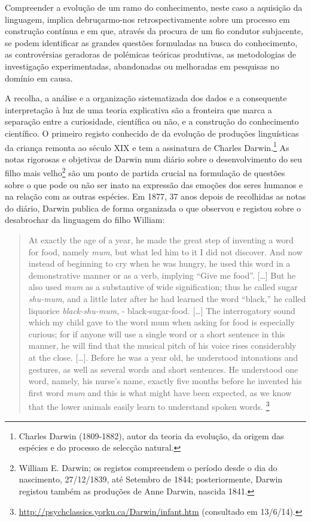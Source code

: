\documentclass[output=paper]{LSP/langsci}
\begin{document}
Compreender a evolução de um ramo do conhecimento, neste caso a aquisição da linguagem, implica debruçarmo-nos retrospectivamente sobre um processo em construção contínua e em que, através da procura de um fio condutor subjacente, se podem identificar as grandes questões formuladas na busca do conhecimento, as controvérsias geradoras de polémicas teóricas produtivas, as metodologias de investigação experimentadas, abandonadas ou melhoradas em pesquisas no domínio em causa.

A recolha, a análise e a organização sistematizada dos dados e a consequente interpretação à luz de uma teoria explicativa são a fronteira que marca a separação entre a curiosidade, científica ou não, e a construção do conhecimento científico. O primeiro registo conhecido de  da evolução de produções linguísticas da criança remonta ao século XIX e tem a assinatura de Charles Darwin.\footnote{Charles Darwin (1809-1882), autor da teoria da evolução, da origem das espécies e do processo de selecção natural.} As notas rigorosas e objetivas de Darwin num diário sobre o desenvolvimento do seu filho mais velho\footnote{William E. Darwin; os registos compreendem o período desde o dia do nascimento, 27/12/1839, até Setembro de 1844; posteriormente, Darwin registou também as produções de Anne Darwin, nascida 1841.} são um ponto de partida crucial na formulação de questões sobre o que pode ou não ser inato na expressão das emoções dos seres humanos e na relação com as outras espécies. Em 1877, 37 anos depois de recolhidas as notas do diário, Darwin publica de forma organizada o que observou e registou sobre o desabrochar da linguagem do filho William: 

\begin{quote}
At exactly the age of a year, he made the great step of inventing a word for food, namely \emph{mum}, but what led him to it I did not discover. And now instead of beginning to cry when he was hungry, he used this word in a demonstrative manner or as a verb, implying ``Give me food''. [\ldots] But he also used \emph{mum} as a substantive of wide signification; thus he called sugar \emph{shu-mum}, and a little later  after he had learned the word ``black,'' he called liquorice \emph{black-shu-mum}, - black-sugar-food. [\ldots] The interrogatory sound which my child gave to the word mum when asking for food is especially curious; for if anyone will use a single word or a short sentence in this manner, he will find that the musical pitch of his voice rises considerably at the close. [\ldots]. Before he was a year old, he understood intonations and gestures, as well as several words and short sentences. He understood one word, namely, his nurse's name, exactly five months before he invented his first word \emph{mum} and this is what might have been expected, as we know that the lower animals easily learn to understand spoken words. \citep[293--294]{darwin1877}\footnote{\url{http://psychclassics.yorku.ca/Darwin/infant.htm} (consultado em 13/6/14).}
\end{quote}
\end{document}
